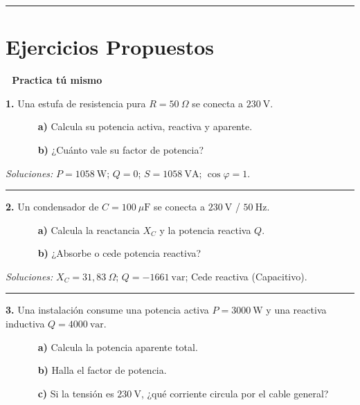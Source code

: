\documentclass[
  a4paper,
  DIV=11,
  numbers=noendperiod]{scrreprt}
\begin{document}
\begin{center}\rule{0.5\linewidth}{0.5pt}\end{center}

\section{Ejercicios Propuestos}\label{ejercicios-propuestos-1}

\begin{tcolorbox}[enhanced jigsaw, breakable, colback=white, left=2mm, leftrule=.75mm, rightrule=.15mm, toprule=.15mm, colframe=quarto-callout-important-color-frame, arc=.35mm, bottomrule=.15mm, opacityback=0]

\vspace{-3mm}\textbf{📝 Practica tú mismo}\vspace{3mm}

\textbf{1.} Una estufa de resistencia pura \(R=50\ \Omega\) se conecta a
\(230\ \text{V}\).\\
\strut ~~~~~~ \textbf{a)} Calcula su potencia activa, reactiva y
aparente.\\
\strut ~~~~~~ \textbf{b)} ¿Cuánto vale su factor de potencia?

\emph{Soluciones:} \(P=1058\ \text{W}\); \(Q=0\); \(S=1058\ \text{VA}\);
\(\cos\varphi=1\).

\begin{center}\rule{0.5\linewidth}{0.5pt}\end{center}

\textbf{2.} Un condensador de \(C=100\ \mu\text{F}\) se conecta a
\(230\ \text{V}\) / \(50\ \text{Hz}\).\\
\strut ~~~~~~ \textbf{a)} Calcula la reactancia \(X_C\) y la potencia
reactiva \(Q\).\\
\strut ~~~~~~ \textbf{b)} ¿Absorbe o cede potencia reactiva?

\emph{Soluciones:} \(X_C=31,83\ \Omega\); \(Q = -1661\ \text{var}\);
Cede reactiva (Capacitivo).

\begin{center}\rule{0.5\linewidth}{0.5pt}\end{center}

\textbf{3.} Una instalación consume una potencia activa
\(P=3000\ \text{W}\) y una reactiva inductiva \(Q=4000\ \text{var}\).\\
\strut ~~~~~~ \textbf{a)} Calcula la potencia aparente total.\\
\strut ~~~~~~ \textbf{b)} Halla el factor de potencia.\\
\strut ~~~~~~ \textbf{c)} Si la tensión es \(230\ \text{V}\), ¿qué
corriente circula por el cable general?


\end{tcolorbox}
\end{document}
